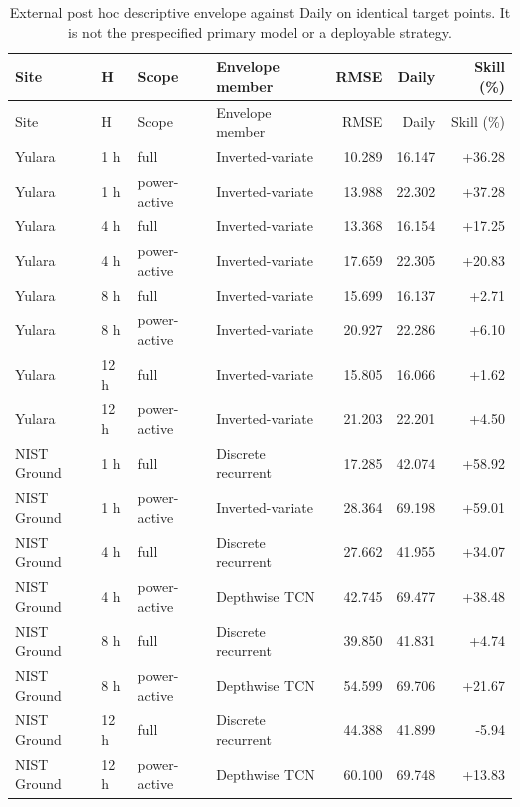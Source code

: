 \begin{longtable}{lll l rrr}
\caption{External post hoc descriptive envelope against Daily on identical target points. It is not the prespecified primary model or a deployable strategy.}\label{tabs:externalenvelope}\\
\toprule Site & H & Scope & Envelope member & RMSE & Daily & Skill (\%)\\\midrule
\endfirsthead\toprule Site & H & Scope & Envelope member & RMSE & Daily & Skill (\%)\\\midrule\endhead
Yulara & 1 h & full & Inverted-variate & 10.289 & 16.147 & +36.28\\
Yulara & 1 h & power-active & Inverted-variate & 13.988 & 22.302 & +37.28\\
Yulara & 4 h & full & Inverted-variate & 13.368 & 16.154 & +17.25\\
Yulara & 4 h & power-active & Inverted-variate & 17.659 & 22.305 & +20.83\\
Yulara & 8 h & full & Inverted-variate & 15.699 & 16.137 & +2.71\\
Yulara & 8 h & power-active & Inverted-variate & 20.927 & 22.286 & +6.10\\
Yulara & 12 h & full & Inverted-variate & 15.805 & 16.066 & +1.62\\
Yulara & 12 h & power-active & Inverted-variate & 21.203 & 22.201 & +4.50\\
NIST Ground & 1 h & full & Discrete recurrent & 17.285 & 42.074 & +58.92\\
NIST Ground & 1 h & power-active & Inverted-variate & 28.364 & 69.198 & +59.01\\
NIST Ground & 4 h & full & Discrete recurrent & 27.662 & 41.955 & +34.07\\
NIST Ground & 4 h & power-active & Depthwise TCN & 42.745 & 69.477 & +38.48\\
NIST Ground & 8 h & full & Discrete recurrent & 39.850 & 41.831 & +4.74\\
NIST Ground & 8 h & power-active & Depthwise TCN & 54.599 & 69.706 & +21.67\\
NIST Ground & 12 h & full & Discrete recurrent & 44.388 & 41.899 & -5.94\\
NIST Ground & 12 h & power-active & Depthwise TCN & 60.100 & 69.748 & +13.83\\
\bottomrule\end{longtable}
